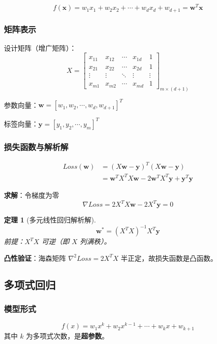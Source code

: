 \documentclass[12pt,a4paper]{ctexart}
\newtheorem{theorem}{定理}[section]
\begin{document}
\[
f(\mathbf{x}) = w_1x_1 + w_2x_2 + \cdots + w_dx_d + w_{d+1} = \mathbf{w}^T\mathbf{x}
\]

\subsubsection{矩阵表示}

设计矩阵（增广矩阵）：
\[
X = \begin{bmatrix}
x_{11} & x_{12} & \cdots & x_{1d} & 1 \\
x_{21} & x_{22} & \cdots & x_{2d} & 1 \\
\vdots & \vdots & \ddots & \vdots & \vdots \\
x_{m1} & x_{m2} & \cdots & x_{md} & 1
\end{bmatrix}_{m \times (d+1)}
\]

参数向量：$\mathbf{w} = [w_1, w_2, \cdots, w_d, w_{d+1}]^T$

标签向量：$\mathbf{y} = [y_1, y_2, \cdots, y_m]^T$

\subsubsection{损失函数与解析解}

\begin{align}
Loss(\mathbf{w}) &= (X\mathbf{w} - \mathbf{y})^T(X\mathbf{w} - \mathbf{y}) \\
&= \mathbf{w}^TX^TX\mathbf{w} - 2\mathbf{w}^TX^T\mathbf{y} + \mathbf{y}^T\mathbf{y}
\end{align}

\textbf{求解}：令梯度为零
\[
\nabla Loss = 2X^TX\mathbf{w} - 2X^T\mathbf{y} = 0
\]

\begin{theorem}[多元线性回归解析解]
\[
\mathbf{w}^* = (X^TX)^{-1}X^T\mathbf{y}
\]
前提：$X^TX$ 可逆（即 $X$ 列满秩）。
\end{theorem}

\textbf{凸性验证}：海森矩阵 $\nabla^2 Loss = 2X^TX$ 半正定，故损失函数是凸函数。


\subsection{多项式回归}

\subsubsection{模型形式}

\[
f(x) = w_1x^k + w_2x^{k-1} + \cdots + w_kx + w_{k+1}
\]
其中 $k$ 为多项式次数，是\textbf{超参数}。
\end{document}
